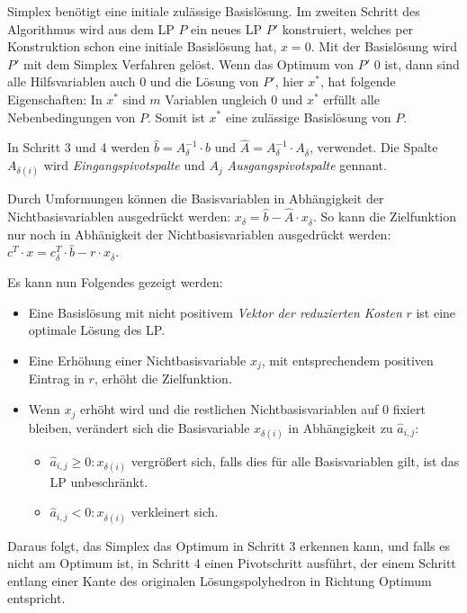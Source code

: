 \documentclass{panikzettel}
\begin{document}
Simplex benötigt eine initiale zulässige Basislösung.
Im zweiten Schritt des Algorithmus wird aus dem LP $P$ ein neues LP $P'$ konstruiert, welches per Konstruktion schon eine initiale Basislösung hat, $x = 0$.
Mit der Basislösung wird $P'$ mit dem Simplex Verfahren gelöst. Wenn das Optimum von $P'$ $0$ ist, dann sind alle Hilfsvariablen auch $0$ und die Lösung von $P'$, hier $x^*$, hat folgende Eigenschaften:
In $x^*$ sind $m$ Variablen ungleich $0$ und $x^*$ erfüllt alle Nebenbedingungen von $P$. Somit ist $x^*$ eine zulässige Basislösung von $P$.

In Schritt 3 und 4 werden $\hat{b} = A_{\delta}^{-1} \cdot b$ und $\hat{A} = A_{\delta}^{-1} \cdot A_{\overline{\delta}}$, verwendet. Die Spalte $A_{\delta(i)}$ wird \emph{Eingangspivotspalte} und $A_j$ \emph{Ausgangspivotspalte} gennant.

Durch Umformungen können die Basisvariablen in Abhängigkeit der Nichtbasisvariablen ausgedrückt werden: $x_{\delta} = \hat{b} - \hat{A} \cdot x_{\overline{\delta}}$.
So kann die Zielfunktion nur noch in Abhänigkeit der Nichtbasisvariablen ausgedrückt werden: $c^T \cdot x = c_{\delta}^T \cdot \hat{b} - r \cdot x_{\overline{\delta}}$.

Es kann nun Folgendes gezeigt werden:
\begin{itemize}
    \item Eine Basislösung mit nicht positivem \emph{Vektor der reduzierten Kosten} $r$ ist eine optimale Lösung des LP.
    \item Eine Erhöhung einer Nichtbasisvariable $x_j$, mit entsprechendem positiven Eintrag in $r$, erhöht die Zielfunktion.
    \item Wenn $x_j$ erhöht wird und die restlichen Nichtbasisvariablen auf $0$ fixiert bleiben, verändert sich die Basisvariable $x_{\delta(i)}$ in Abhängigkeit zu $\hat{a}_{i,j}$:
    \begin{itemize}
        \item $\hat{a}_{i,j} \geq 0 : x_{\delta(i)}$ vergrößert sich, falls dies für alle Basisvariablen gilt, ist das LP unbeschränkt.
        \item $\hat{a}_{i,j} < 0 : x_{\delta(i)}$ verkleinert sich.
    \end{itemize}
\end{itemize}

Daraus folgt, das Simplex das Optimum in Schritt 3 erkennen kann, und falls es nicht am Optimum ist, in Schritt 4 einen Pivotschritt ausführt, der einem Schritt entlang einer Kante des originalen Lösungspolyhedron in Richtung Optimum entspricht.
\end{document}
